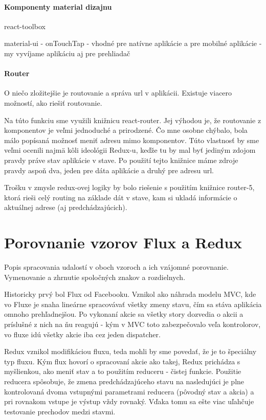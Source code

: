 \paragraph{Komponenty material dizajnu}
\TODO{}

react-toolbox

material-ui
- onTouchTap
- vhodné pre natívne aplikácie a pre mobilné aplikácie
- my vyvíjame aplikáciu aj pre prehliadač

\paragraph{Router}%
O niečo zložitejšie je routovanie a správa url v aplikácii. Existuje viacero možností, ako riešiť routovanie. 

Na túto funkciu sme využili knižnicu react-router. Jej výhodou je, že routovanie z komponentov je veľmi jednoduché a prirodzené. Čo mne osobne chýbalo, bola málo popísaná možnosť meniť adresu mimo komponentov. Túto vlastnosť by sme veľmi ocenili najmä kôli ideológii Redux-u, keďže tu by mal byť jediným zdojom pravdy práve stav aplikácie v stave. Po použití tejto knižnice máme zdroje pravdy aspoň dva, jeden pre dáta aplikácie a druhý pre adresu url. %

Trošku  v zmysle redux-ovej logiky by bolo riešenie s použitím knižnice router-5, ktorá rieši celý routing na základe dát v stave, kam si ukladá informácie o aktuálnej adrese (aj predchádzajúcich).

\cite[Redux]{Redux}






\section{Porovnanie vzorov Flux a Redux}
Popis spracovania udalostí v oboch vzoroch a ich vzájomné porovnanie. Vymenovanie a zhrnutie spoločných znakov a rozdielnych.

Historicky prvý bol Flux od Facebooku. Vznikol ako náhrada modelu MVC, kde vo Fluxe je snaha lineárne spracovávať všetky zmeny stavu, čím sa stáva aplikácia omnoho prehľadnejšou. Po vykonaní akcie sa všetky story dozvedia o akcii a príslušné z nich na ňu reagujú - kým v MVC toto zabezpečovalo veľa kontrolorov, vo fluxe idú všetky akcie iba cez jeden dispatcher.

Redux vznikol modifikáciou fluxu, teda mohli by sme povedať, že je to špeciálny typ fluxu. Kým flux hovorí o spracovaní akcie ako takej, Redux prichádza s myšlienkou, ako meniť stav a to použitím reduceru - čistej funkcie. Použitie reducera spôsobuje, že zmena predchádzajúceho stavu na nasledujúci je plne kontrolovaná dvoma vstupnými parametrami reducera (pôvodný stav a akcia) a pri rovnakom vstupe je výstup vždy rovnaký. Vďaka tomu sa ešte viac uľahčuje testovanie prechodov medzi stavmi.

